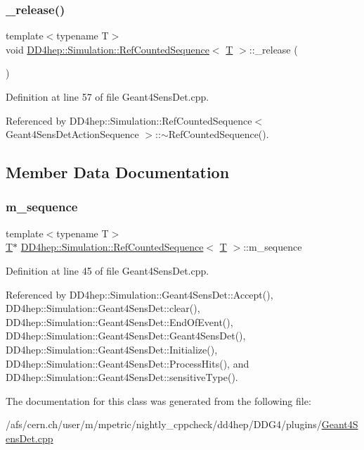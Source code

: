 \subsubsection{\texorpdfstring{\+\_\+release()}{\_release()}}
{\footnotesize\ttfamily template$<$typename T$>$ \\
void \hyperlink{class_d_d4hep_1_1_simulation_1_1_ref_counted_sequence}{D\+D4hep\+::\+Simulation\+::\+Ref\+Counted\+Sequence}$<$ \hyperlink{class_t}{T} $>$\+::\+\_\+release (\begin{DoxyParamCaption}{ }\end{DoxyParamCaption})\hspace{0.3cm}{\ttfamily [inline]}}



Definition at line 57 of file Geant4\+Sens\+Det.\+cpp.



Referenced by D\+D4hep\+::\+Simulation\+::\+Ref\+Counted\+Sequence$<$ Geant4\+Sens\+Det\+Action\+Sequence $>$\+::$\sim$\+Ref\+Counted\+Sequence().



\subsection{Member Data Documentation}
\hypertarget{class_d_d4hep_1_1_simulation_1_1_ref_counted_sequence_a8fb29db1af39af7f025ed8d1b20b6dfe}{}\label{class_d_d4hep_1_1_simulation_1_1_ref_counted_sequence_a8fb29db1af39af7f025ed8d1b20b6dfe} 
\subsubsection{\texorpdfstring{m\+\_\+sequence}{m\_sequence}}
{\footnotesize\ttfamily template$<$typename T$>$ \\
\hyperlink{class_t}{T}$\ast$ \hyperlink{class_d_d4hep_1_1_simulation_1_1_ref_counted_sequence}{D\+D4hep\+::\+Simulation\+::\+Ref\+Counted\+Sequence}$<$ \hyperlink{class_t}{T} $>$\+::m\+\_\+sequence}



Definition at line 45 of file Geant4\+Sens\+Det.\+cpp.



Referenced by D\+D4hep\+::\+Simulation\+::\+Geant4\+Sens\+Det\+::\+Accept(), D\+D4hep\+::\+Simulation\+::\+Geant4\+Sens\+Det\+::clear(), D\+D4hep\+::\+Simulation\+::\+Geant4\+Sens\+Det\+::\+End\+Of\+Event(), D\+D4hep\+::\+Simulation\+::\+Geant4\+Sens\+Det\+::\+Geant4\+Sens\+Det(), D\+D4hep\+::\+Simulation\+::\+Geant4\+Sens\+Det\+::\+Initialize(), D\+D4hep\+::\+Simulation\+::\+Geant4\+Sens\+Det\+::\+Process\+Hits(), and D\+D4hep\+::\+Simulation\+::\+Geant4\+Sens\+Det\+::sensitive\+Type().



The documentation for this class was generated from the following file\+:\begin{DoxyCompactItemize}
\item 
/afs/cern.\+ch/user/m/mpetric/nightly\+\_\+cppcheck/dd4hep/\+D\+D\+G4/plugins/\hyperlink{_geant4_sens_det_8cpp}{Geant4\+Sens\+Det.\+cpp}\end{DoxyCompactItemize}
